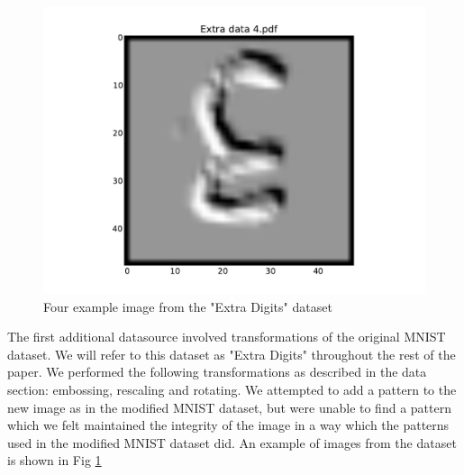 \documentclass[conference]{IEEEtran}
\begin{document}
\begin{figure}[h]
	\includegraphics[scale=0.15]{Extradata4.pdf}
	\caption{Four example image from the "Extra Digits" dataset}
	\label{ExtraData}
\end{figure}

The first additional datasource involved transformations of the original MNIST dataset. We will refer to this dataset as "Extra Digits" throughout the rest of the paper. We performed the following transformations as described in the data section: embossing, rescaling and rotating. 
We attempted to add a pattern to the new image as in the modified MNIST dataset, but were unable to find a pattern which we felt maintained the integrity of the image in a way which the patterns used in the modified MNIST dataset did. An example of images from the dataset is shown in Fig \ref{ExtraData}
\end{document}

